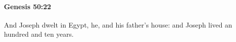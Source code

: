 
		\paragraph{Genesis 50:22} %
			\label{GENESIS-50-22}

			And Joseph dwelt in Egypt, he, and his father’s house: and Joseph lived an hundred and ten years.



